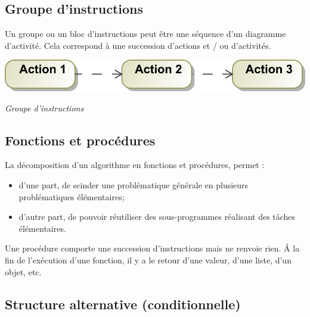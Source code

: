 \documentclass[10pt,fleqn]{article} %
\begin{document}
\subsection{Groupe d'instructions}

Un groupe ou un bloc d’instructions peut être une séquence d’un diagramme
d’activité. Cela correspond à une succession d’actions et / ou d’activités.

\begin{center}
\includegraphics[width=.5\textwidth]{images/GroupeInstruction}

\textit{Groupe d'instructions}
\end{center}



\subsection{Fonctions et procédures}
La décomposition d’un algorithme en fonctions et procédures, permet :
\begin{itemize}
\item d’une part, de scinder une problématique générale en plusieurs problématiques
élémentaires;
\item d’autre part, de pouvoir réutiliser des sous-programmes réalisant des tâches élémentaires.
\end{itemize}

%
%
%

Une procédure comporte une succession d’instructions mais ne renvoie rien.
\'A la fin de l’exécution d’une fonction, il y a le retour d’une valeur, d’une liste, d’un objet, etc.
\subsection{Structure alternative (conditionnelle)}
\end{document}
